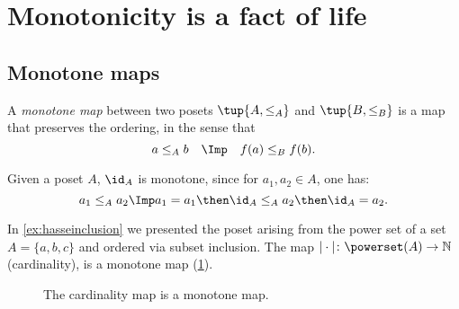 \section{Monotonicity is a fact of life}
\subsection{Monotone maps}

\begin{definition}
A \emph{monotone map} between two posets
$\tup{A, \leq_A}$ and $\tup{B, \leq_B}$ is a map that preserves the ordering, in the sense that 
\begin{equation}
 a \leq_A b \quad \Imp \quad f(a) \leq_B f(b).
\end{equation}

\begin{comment}\noindent A monotone map is an \emph{isomorphism} if the other direction
of the implication holds as well:
\begin{equation}
 a \leq_A b \quad \Leftrightarrow \quad f(a) \leq_B f(b).
\end{equation}
\end{comment}
\end{definition}
\begin{remark}
Given a poset $A$, $\id_A$ is monotone, since for $a_1,a_2\in A$, one has:
\begin{equation}
a_1\leq_A a_2 \Imp a_1=a_1\then \id_A \leq_A a_2\then \id_A = a_2.
\end{equation}
\end{remark}

\begin{example}
In \cref{ex:hasseinclusion} we presented the poset arising from the power set of a set $A=\{a,b,c\}$ and ordered via subset inclusion. The map $\vert \cdot \vert \colon \powerset(A)\to \mathbb{N}$ (cardinality), is a monotone map (\cref{fig:cardinality}).
\begin{figure}[h!]
\begin{center}
\end{center}
\caption{The cardinality map is a monotone map. \label{fig:cardinality}}
\end{figure}
\end{example}

